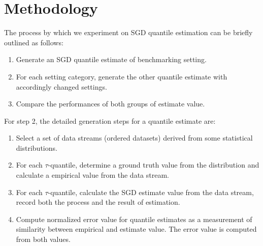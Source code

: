 \documentclass[12pt]{article}
\begin{document}
\section{Methodology}
The process by which we experiment on SGD quantile estimation can be briefly outlined as follows:
\begin{enumerate}
    \item Generate an SGD quantile estimate of benchmarking setting.
    \item For each setting category, generate the other quantile estimate with accordingly changed settings.
    \item Compare the performances of both groups of estimate value.
\end{enumerate}
For step 2, the detailed generation steps for a quantile estimate are:
\begin{enumerate}[label=(\roman*)]
    \item Select a set of data streams (ordered datasets) derived from some statistical distributions.
    \item For each $\tau$-quantile, determine a ground truth value from the distribution and calculate a empirical value from the data stream.
    \item For each $\tau$-quantile, calculate the SGD estimate value from the data stream, record both the process and the result of estimation.
    \item Compute normalized error value for quantile estimates as a measurement of similarity between empirical and estimate value. The error value is computed from both values.
\end{enumerate}
\end{document}
